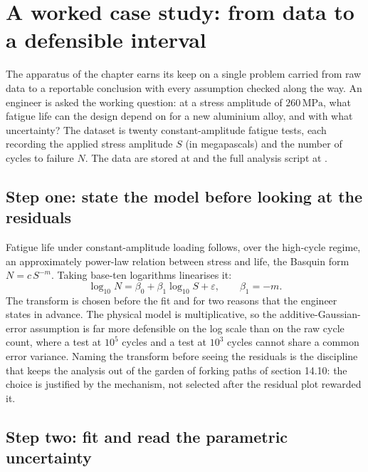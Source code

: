 \section{A worked case study: from data to a defensible interval}

The apparatus of the chapter earns its keep on a single problem
carried from raw data to a reportable conclusion with every
assumption checked along the way. An engineer is asked the working
question: at a stress amplitude of $260\,\si{\mega\pascal}$, what
fatigue life can the design depend on for a new aluminium alloy, and
with what uncertainty? The dataset is twenty constant-amplitude
fatigue tests, each recording the applied stress amplitude $S$ (in
megapascals) and the number of cycles to failure $N$. The data are
stored at
and the full analysis script at
.

\subsection{Step one: state the model before looking at the residuals}

Fatigue life under constant-amplitude loading follows, over the
high-cycle regime, an approximately power-law relation between stress
and life, the Basquin form $N = c\,S^{-m}$. Taking base-ten
logarithms linearises it:
\[
\log_{10} N = \beta_{0} + \beta_{1}\log_{10} S + \varepsilon,
\qquad \beta_{1} = -m.
\]
The transform is chosen before the fit and for two reasons that the
engineer states in advance. The physical model is multiplicative, so
the additive-Gaussian-error assumption is far more defensible on the
log scale than on the raw cycle count, where a test at $10^{5}$
cycles and a test at $10^{3}$ cycles cannot share a common error
variance. Naming the transform before seeing the residuals is the
discipline that keeps the analysis out of the garden of forking
paths of section 14.10: the choice is justified by the mechanism, not
selected after the residual plot rewarded it.

\subsection{Step two: fit and read the parametric uncertainty}


